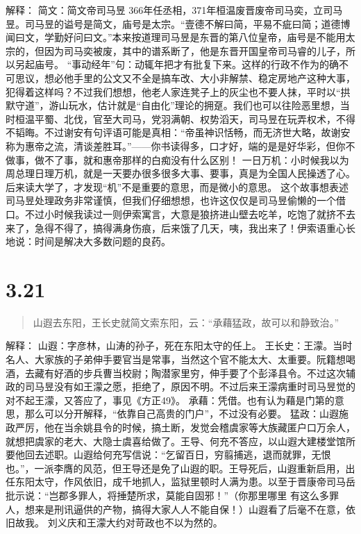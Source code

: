 \documentclass[]{book}
\begin{document}
解释： 简文：简文帝司马昱
366年任丞相，371年桓温废晋废帝司马奕，立司马昱。司马昱的谥号是简文，庙号是太宗。``壹德不解曰简，平易不疵曰简；道德博闻曰文，学勤好问曰文。''本来按道理司马昱是东晋的第八位皇帝，庙号是不能用太宗的，但因为司马奕被废，其中的谱系断了，他是东晋开国皇帝司马睿的儿子，所以另起庙号。
``事动经年''句：动辄年把才有批复下来。这样的行政不作为的确不可思议，想必他手里的公文又不全是搞车改、大小非解禁、稳定房地产这种大事，犯得着这样吗？不过我们想想，他老人家连凳子上的灰尘也不要人抹，平时以``拱默守道''，游山玩水，估计就是``自由化''理论的拥趸。我们也可以往险恶里想，当时桓温平蜀、北伐，官至大司马，党羽满朝、权势滔天，司马昱在玩弄权术，不得不韬晦。不过谢安有句评语可能是真相：``帝虽神识恬畅，而无济世大略，故谢安称为惠帝之流，清谈差胜耳。''------你书读得多，口才好，端的是是好华彩，但你不做事，做不了事，就和惠帝那样的白痴没有什么区别！
一日万机：小时候我以为周总理日理万机，就是一天要办很多很多大事、要事，真是为全国人民操透了心。后来读大学了，才发现``机''不是重要的意思，而是微小的意思。
这个故事想表述司马昱处理政务非常谨慎，但我们仔细想想，也许这仅仅是司马昱偷懒的一个借口。不过小时候我读过一则伊索寓言，大意是狼挤进山壁去吃羊，吃饱了就挤不去来了，急得不得了，搞得满身伤痕，后来饿了几天，咦，我出来了！伊索语重心长地说：时间是解决大多数问题的良药。

\section{3.21}\label{section-175}

\begin{quote}
山遐去东阳，王长史就简文索东阳，云：``承藉猛政，故可以和静致治。''
\end{quote}

解释： 山遐：字彦林，山涛的孙子，死在东阳太守的任上。
王长史：王濛。当时名人、大家族的子弟伸手要官当是常事，当然这个官不能太大、太重要。阮籍想喝酒，去藏有好酒的步兵曹当校尉；陶潜家里穷，伸手要了个彭泽县令。不过这次辅政的司马昱没有如王濛之愿，拒绝了，原因不明。不过后来王濛病重时司马昱觉的对不起王濛，又答应了，事见《方正49》。
承藉：凭借。也有认为藉是门第的意思，那么可以分开解释，``依靠自己高贵的门户''，不过没有必要。
猛政：山遐施政严厉，他在当余姚县令的时候，搞土断，发觉会稽虞家等大族藏匿户口万余人，就想把虞家的老大、大隐士虞喜给做了。王导、何充不答应，以山遐大建楼堂馆所要他回去述职。山遐给何充写信说：``乞留百日，穷翦捕逃，退而就罪，无恨也。''，一派李膺的风范，但王导还是免了山遐的职。王导死后，山遐重新启用，出任东阳太守，作风依旧，成千地抓人，监狱里顿时人满为患。以至于晋康帝司马岳批示说：``岂郡多罪人，将捶楚所求，莫能自固邪！''（你那里哪里
有这么多罪人，想来是刑讯逼供的产物，搞得大家人人不能自保！）山遐看了后毫不在意，依旧故我。
刘义庆和王濛大约对苛政也不以为然的。
\end{document}
